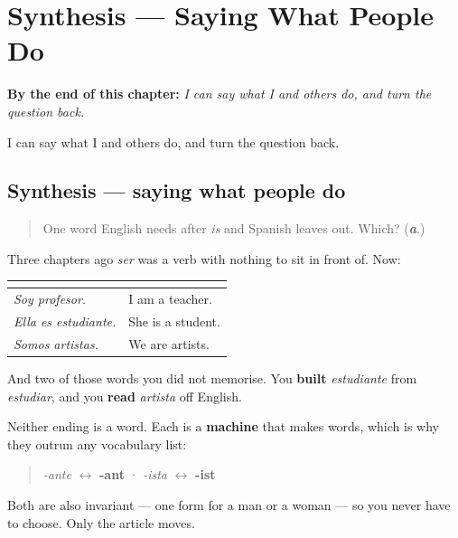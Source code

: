 
\chapter{Synthesis --- Saying What People Do}
\label{ch:sintesis-trabajo}

\begin{chapteropening}
\textbf{By the end of this chapter:} \emph{I can say what I and others do, and turn the question back.}

I can say what I and others do, and turn the question back.
\end{chapteropening}

\section[Practice]{Synthesis — saying what people do}

\label{lesson:ES-C09-sintesis-trabajo}



\begin{quote}
One word English needs after \emph{is} and Spanish leaves out. Which? (\emph{\textbf{a}}.)
\end{quote}

\begin{grammarlens}[title={What you've built}]
Three chapters ago \emph{ser} was a verb with nothing to sit in front of. Now:

\noindent
\begin{tabularx}{\linewidth}{@{}>{\raggedright\arraybackslash}X>{\raggedright\arraybackslash}X@{}}
\toprule
\textbf{} & \textbf{} \\
\midrule
\emph{Soy profesor.} & I am a teacher. \\
\emph{Ella es estudiante.} & She is a student. \\
\emph{Somos artistas.} & We are artists. \\
\bottomrule
\end{tabularx}

And two of those words you did not memorise. You \textbf{built} \emph{estudiante} from \emph{estudiar}, and you \textbf{read} \emph{artista} off English.
\end{grammarlens}

\begin{grammarlens}[title={Grammar Lens: what the two endings are worth}]
Neither ending is a word. Each is a \textbf{machine} that makes words, which is why they outrun any vocabulary list:

\begin{quote}
\emph{-ante} $\leftrightarrow$ \textbf{-ant} · \emph{-ista} $\leftrightarrow$ \textbf{-ist}
\end{quote}

Both are also invariant — one form for a man or a woman — so you never have to choose. Only the article moves.
\end{grammarlens}


